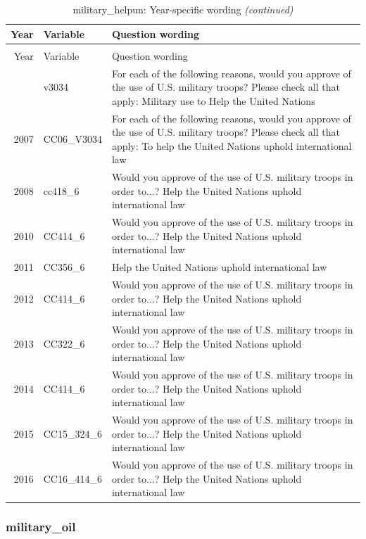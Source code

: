 \documentclass[12pt]{article}
\begin{document}
\begin{longtable}[t]{rl>{\raggedright\arraybackslash}p{10cm}}
\caption{\label{tab:unnamed-chunk-4}military\_helpun: Year-specific wording}\\
\toprule
Year & Variable & Question wording\\
\midrule
\endfirsthead
\caption[]{military\_helpun: Year-specific wording \textit{(continued)}}\\
\toprule
Year & Variable & Question wording\\
\midrule
\endhead
\
\endfoot
\bottomrule
\endlastfoot
2006 & v3034 & For each of the following reasons, would you approve of the use of U.S. military troops? Please check all that apply: Military use to Help the United Nations\\
2007 & CC06\_V3034 & For each of the following reasons, would you approve of the use of U.S. military troops? Please check all that apply: To help the United Nations uphold international law\\
2008 & cc418\_6 & Would you approve of the use of U.S. military troops in order to...? Help the United Nations uphold international law\\
2010 & CC414\_6 & Would you approve of the use of U.S. military troops in order to...? Help the United Nations uphold international law\\
2011 & CC356\_6 & Help the United Nations uphold international law\\
2012 & CC414\_6 & Would you approve of the use of U.S. military troops in order to...? Help the United Nations uphold international law\\
2013 & CC322\_6 & Would you approve of the use of U.S. military troops in order to...? Help the United Nations uphold international law\\
2014 & CC414\_6 & Would you approve of the use of U.S. military troops in order to...? Help the United Nations uphold international law\\
2015 & CC15\_324\_6 & Would you approve of the use of U.S. military troops in order to...? Help the United Nations uphold international law\\
2016 & CC16\_414\_6 & Would you approve of the use of U.S. military troops in order to...? Help the United Nations uphold international law\\*
\end{longtable}

\subsubsection{military\_oil}\label{military_oil}
\end{document}
